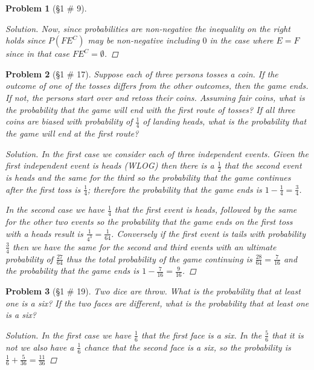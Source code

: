 \documentclass[11pt, oneside]{book}   	%
\newtheorem{problem}{Problem}[chapter]
\begin{document}
\begin{spacing}{1.618}
\begin{problem}[\S 1 \# 9]
\begin{proof}[Solution]
		Now, since probabilities are non-negative the inequality on the right holds since $P\left(FE^C\right)$ may be non-negative including $0$ in the case where $E=F$ since in that case $FE^C=\emptyset$. 
		
	\end{proof}
\end{problem}

\begin{problem}[\S 1 \# 17]
	Suppose each of three persons tosses a coin. If the outcome of one of the tosses differs from the other outcomes, then the game ends. If not, the persons start over and retoss their coins. Assuming fair coins, what is the probability that the game will end with the first route of tosses? If all three coins are biased with probability of $\frac{1}{4}$ of landing heads, what is the probability that the game will end at the first route? 
	\begin{proof}[Solution]
		In the first case we consider each of three independent events. Given the first independent event is heads (WLOG) then there is a $\frac{1}{2}$ that the second event is heads and the same for the third so the probability that the game continues after the first toss is $\frac{1}{4}$; therefore the probability that the game ends is $1-\frac{1}{4}=\frac{3}{4}$. 
		
		In the second case we have $\frac{1}{4}$ that the first event is heads, followed by the same for the other two events so the probability that the game ends on the first toss with a heads result is $\frac{1}{4^3}=\frac{1}{64}$. Conversely if the first event is tails with probability $\frac{3}{4}$ then we have the same for the second and third events with an ultimate probability of $\frac{27}{64}$ thus the total probability of the game continuing is $\frac{28}{64}=\frac{7}{16}$ and the probability that the game ends is $1-\frac{7}{16}=\frac{9}{16}$. 
	\end{proof}
\end{problem}

\begin{problem}[\S 1 \# 19]
	Two dice are throw. What is the probability that at least one is a six? If the two faces are different, what is the probability that at least one is a six? 
	\begin{proof}[Solution]
		In the first case we have $\frac{1}{6}$ that the first face is a six. In the $\frac{5}{6}$ that it is not we also have a $\frac{1}{6}$ chance that the second face is a six, so the probability is $\frac{1}{6}+\frac{5}{36}=\frac{11}{36}$ 
		

\end{proof}
\end{problem}
\end{spacing}
\end{document}
